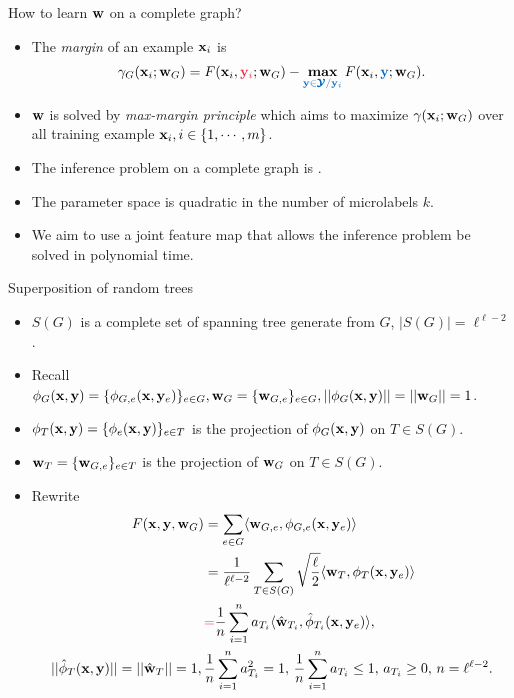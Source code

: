 \documentclass[first=dgreen,second=purple,logo=yellowexc]{aaltoslides}
\begin{document}
%
\begin{frame}{How to learn $\mathbf {w}$ on a complete graph?}
	\begin{itemize}\footnotesize
		\item The \textit{margin} of an example $\mathbf {x}_i$ is
		\begin{align*}
			\gamma_G(\vx_i;\vw_G) = F(\vx_i,{\color{aaltored} \vy_i};\vw_G) - \underset{{\color{aaltoblue}\vy\in\vYcal/\vy_i}}{\maximize}\,F(\vx_i,{\color{aaltoblue}\vy};\vw_G).
		\end{align*}
		\item $\mathbf {w}$ is solved by \textit{max-margin principle} which aims to maximize $\gamma(\mathbf {x}_i;\mathbf {w}_G)$ over all training example $\mathbf {x}_i,i\in\{1,\cdots,m\}$.
		\item The inference problem on a complete graph is \nphardness.
		\item The parameter space is quadratic in the number of microlabels $k$.
		\item We aim to use a joint feature map that allows the inference problem be solved in polynomial time.
	\end{itemize}
\end{frame}



%
\begin{frame}{Superposition of random trees}
	\begin{itemize}\footnotesize
		\item $S(G)$ is a complete set of spanning tree generate from $G$, $|S(G)| = \ell^{\ell-2}$.
		\item Recall $\phi_G(\mathbf {x},\mathbf {y}) = \{\phi_{G,e}(\mathbf {x},\mathbf {y}_e)\}_{e\in G},\mathbf {w}_G = \{\mathbf {w}_{G,e}\}_{e\in G},||\phi_G(\mathbf {x},\mathbf {y})||=||\mathbf {w}_{G}||=1$.
		\item $\phi_T(\mathbf {x},\mathbf {y})=\{\phi_e(\mathbf {x},\mathbf {y})\}_{e\in T}$ is the projection of $\phi_G(\mathbf {x},\mathbf {y})$ on $T\in S(G)$.
		\item $\mathbf {w}_{T}=\{\mathbf {w}_{G,e}\}_{e\in T}$ is the projection of $\mathbf {w}_G$ on $T\in S(G)$.
		\item Rewrite
		\begin{align*}
			F(\vx,\vy,\vw_G) &= \sum_{e\in G}\ip{\vw_{G,e}}{\phi_{G,e}(\vx,\vy_e)} \\
			& = \frac{1}{\ell^{\ell-2}}\sum_{T\in S(G)}\sqrt{\frac{\ell}{2}}\ip{\vw_{T}}{\phi_{T}(\vx,\vy_e)}\\
			& {\color{aaltored} =} \frac{1}{n}\sum_{i = 1}^{n}a_{T_i}\ip{\hat{\vw}_{T_i}}{\hat{\phi}_{T_i}(\vx,\vy_e)},\\
			||\hat{\phi}_T(\vx,\vy)||=||\hat{\vw}_{T}||=1,\, & \frac{1}{n}\sum_{i = 1}^{n}a_{T_i}^2=1, \, \frac{1}{n}\sum_{i = 1}^{n}a_{T_i}\le1,\, a_{T_i}\ge0,\, n=\ell^{\ell-2}.
		\end{align*}
	\end{itemize}
\end{frame}
\end{document}
